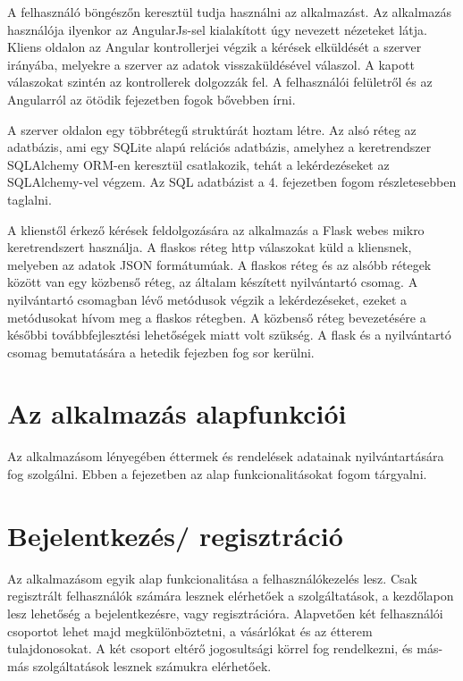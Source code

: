 A felhasználó böngészőn keresztül tudja használni az alkalmazást. Az alkalmazás használója ilyenkor az AngularJs-sel kialakított úgy nevezett nézeteket látja. Kliens oldalon az Angular kontrollerjei végzik a kérések elküldését a szerver irányába, melyekre a szerver az adatok visszaküldésével válaszol. A kapott válaszokat szintén az kontrollerek dolgozzák fel. A felhasználói felületről és az Angularról az ötödik fejezetben fogok bővebben írni.


A szerver oldalon egy többrétegű struktúrát hoztam létre. Az alsó réteg az adatbázis, ami egy SQLite alapú relációs adatbázis, amelyhez a keretrendszer SQLAlchemy ORM-en keresztül csatlakozik, tehát a lekérdezéseket az SQLAlchemy-vel végzem. Az SQL adatbázist a 4. fejezetben fogom részletesebben taglalni.

A klienstől érkező kérések feldolgozására az alkalmazás a Flask webes mikro keretrendszert használja. A flaskos réteg http válaszokat küld a kliensnek, melyeben az adatok JSON formátumúak. A flaskos réteg és az alsóbb rétegek között van egy közbenső réteg, az általam készített nyilvántartó csomag. A nyilvántartó csomagban lévő metódusok végzik a lekérdezéseket, ezeket a metódusokat hívom meg a flaskos rétegben. A közbenső réteg bevezetésére a későbbi továbbfejlesztési lehetőségek miatt volt szükség. A flask és a nyilvántartó csomag bemutatására a hetedik fejezben fog sor kerülni.

\section{Az alkalmazás alapfunkciói}

Az alkalmazásom lényegében éttermek és rendelések adatainak nyilvántartására fog szolgálni. Ebben a fejezetben az alap funkcionalitásokat fogom tárgyalni.

\section{Bejelentkezés/ regisztráció}

Az alkalmazásom egyik alap funkcionalitása a felhasználókezelés lesz. Csak regisztrált felhasználók számára lesznek elérhetőek a szolgáltatások, a kezdőlapon lesz lehetőség a bejelentkezésre, vagy regisztrációra. Alapvetően két felhasználói csoportot lehet majd megkülönböztetni, a vásárlókat és az étterem tulajdonosokat. A két csoport eltérő jogosultsági körrel fog rendelkezni, és más-más szolgáltatások lesznek számukra elérhetőek.

